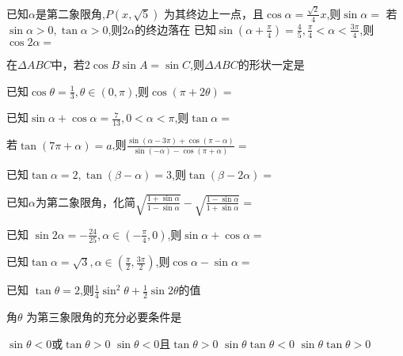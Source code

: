 \documentclass[12pt,answers]{exam}
\begin{document}
\pagestyle{plain}
\begin{center}
{}
\end{center}

\begin{questions}
\question 
已知$\alpha$是第二象限角,$P(x,\sqrt{5})$ 为其终边上一点，且$\displaystyle \cos{\alpha}=\frac{\sqrt{2}}{4}x$,则$\sin{\alpha}=$
\question 
若$\sin{\alpha}>0,\tan{\alpha}>0$,则$2\alpha$的终边落在
\question 
已知$\displaystyle \sin{(\alpha+\frac{\pi}{4})}=\frac{4}{5},\frac{\pi}{4}<\alpha<\frac{3\pi}{4}$,则$\cos{2\alpha}=$

\question 
在$\Delta ABC$中，若$2\cos{B}\sin{A}=\sin{C}$,则$\Delta ABC$的形状一定是\fillin[ 等腰三角形]

\question 
已知$\displaystyle \cos{\theta}=\frac{1}{3},\theta \in(0,\pi)$,则$\cos{(\pi+2\theta)}=$

\question 
已知$\displaystyle \sin{\alpha}+\cos{\alpha}=\frac{7}{13},0<\alpha<\pi$,则$\tan{\alpha}=$ 

\question 
若$\tan{(7\pi+\alpha)}=a$,则$\displaystyle \frac{\sin{(\alpha-3\pi)}+\cos{(\pi-\alpha)}}{\sin{(-\alpha)}-\cos{(\pi+\alpha)}}=$

\question 

已知$\tan{\alpha}=2,\tan{(\beta-\alpha)}=3$,则$\tan{(\beta-2\alpha)}=$

\question 
已知$\alpha$为第二象限角，化简$\displaystyle \sqrt{\frac{1+\sin{\alpha}}{1-\sin{\alpha}}}-\sqrt{\frac{1-\sin{\alpha}}{1+\sin{\alpha}}}=$\fillin[$\displaystyle  2\tan{\alpha}$]

\question 
已知 $\displaystyle \sin{2\alpha}=-\frac{24}{25},\alpha \in (-\frac{\pi}{4},0)$,则$\sin\alpha+\cos\alpha=$ 

\question 
已知$\displaystyle \tan{\alpha}=\sqrt{3},\alpha \in(\frac{\pi}{2},\frac{3\pi}{2})$,则$\cos\alpha-\sin\alpha=$

\question 
已知 $\tan{\theta}=2$,则$\displaystyle \frac{1}{4}\sin^2\theta+\frac{1}{2}\sin{2\theta}$的值

\question 
角$\theta$ 为第三象限角的充分必要条件是\fillin[B]\\
\begin{oneparchoices}
\choice $\displaystyle \sin\theta<0 \text{或} \tan\theta>0$
\choice $\displaystyle \sin\theta<0 \text{且} \tan\theta>0$ 
\choice $\displaystyle \sin\theta\tan\theta<0$
\choice $\displaystyle \sin\theta\tan\theta>0$ 
\end{oneparchoices}


\end{questions}
\end{document}
